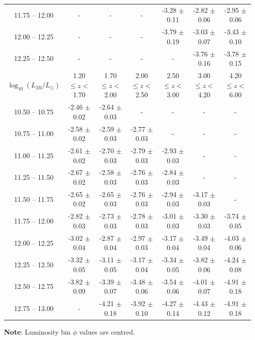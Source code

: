 \begin{landscape}
\begin{table}
\begin{center}
\begin{tabular}{@{}ccccccc@{}}
        11.75 -- 12.00 & -                  & -                 & -                 & -3.28 $\pm$ 0.11  & -2.82 $\pm$ 0.06  & -2.95 $\pm$ 0.06 \\
        12.00 -- 12.25 & -                  & -                 & -                 & -3.79 $\pm$ 0.19  & -3.03 $\pm$ 0.07  & -3.43 $\pm$ 0.10 \\
        12.25 -- 12.50 & -                  & -                 & -                 & -                 & -3.76 $\pm$ 0.16  & -3.78 $\pm$ 0.15 \\
        \hline
        $\log_{10}(L_{IR}/L_{\odot})$ & 1.20 $\leq z <$ 1.70 & 1.70 $\leq z <$ 2.00 & 2.00 $\leq z <$ 2.50 & 2.50 $\leq z <$ 3.00 & 3.00 $\leq z <$ 4.20 & 4.20 $\leq z <$ 6.00  \\
        \hline
        10.50 -- 10.75 & -2.46 $\pm$ 0.02   & -2.64 $\pm$ 0.03  & - & - & - & - \\
        10.75 -- 11.00 & -2.58 $\pm$ 0.02   & -2.59 $\pm$ 0.03  & -2.77 $\pm$ 0.03  & - & - & - \\
        11.00 -- 11.25 & -2.61 $\pm$ 0.02   & -2.70 $\pm$ 0.03  & -2.79 $\pm$ 0.03  & -2.93 $\pm$ 0.03  & - & - \\
        11.25 -- 11.50 & -2.67 $\pm$ 0.02   & -2.58 $\pm$ 0.03  & -2.76 $\pm$ 0.03  & -2.84 $\pm$ 0.03  & - & - \\
        11.50 -- 11.75 & -2.65 $\pm$ 0.02   & -2.65 $\pm$ 0.03  & -2.76 $\pm$ 0.03  & -2.94 $\pm$ 0.03  & -3.17 $\pm$ 0.03 & - \\
        11.75 -- 12.00 & -2.82 $\pm$ 0.03   & -2.73 $\pm$ 0.03  & -2.78 $\pm$ 0.03  & -3.01 $\pm$ 0.03  & -3.30 $\pm$ 0.03 & -3.74 $\pm$ 0.05 \\
        12.00 -- 12.25 & -3.02 $\pm$ 0.04   & -2.87 $\pm$ 0.04  & -2.97 $\pm$ 0.03  & -3.17 $\pm$ 0.04  & -3.49 $\pm$ 0.04 & -4.03 $\pm$ 0.06 \\
        12.25 -- 12.50 & -3.32 $\pm$ 0.05   & -3.11 $\pm$ 0.05  & -3.17 $\pm$ 0.04  & -3.34 $\pm$ 0.05  & -3.82 $\pm$ 0.06 & -4.24 $\pm$ 0.08 \\
        12.50 -- 12.75 & -3.82 $\pm$ 0.09   & -3.39 $\pm$ 0.07  & -3.48 $\pm$ 0.06  & -3.54 $\pm$ 0.06  & -4.01 $\pm$ 0.07 & -4.91 $\pm$ 0.18 \\
        12.75 -- 13.00 & -                  & -4.21 $\pm$ 0.18  & -3.92 $\pm$ 0.10  & -4.27 $\pm$ 0.14  & -4.43 $\pm$ 0.12 & -4.91 $\pm$ 0.18 \\
        \bottomrule
    \end{tabular}
    \end{center}
    \textbf{Note}: Luminosity bin $\phi$ values are centred.
    \end{table}
\end{landscape}

